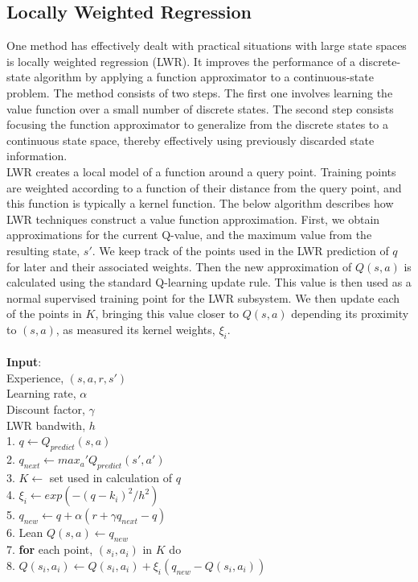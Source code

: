 \documentclass[11pt]{article}
\theoremstyle{definition}
\begin{document}
\subsection{Locally Weighted Regression}
One method has effectively dealt with practical situations with large state spaces is locally weighted regression (LWR). It improves the performance of a discrete-state algorithm by applying a function approximator to a continuous-state problem. The method consists of two steps. The first one involves learning the value function over a small number of discrete states. The second step consists focusing the function approximator to generalize from the discrete states to a continuous state space, thereby effectively using previously discarded state information.\\

LWR creates a local model of a function around a query point. Training points are weighted according to a function of their distance from the query point, and this function is typically a kernel function. The below algorithm describes how LWR techniques construct a value function approximation. First, we obtain approximations for the current Q-value, and the maximum value from the resulting state, $s'$. We keep track of the points used in the LWR prediction of $q$ for later and their associated weights. Then the new approximation of $Q(s,a)$ is calculated  using the standard Q-learning update rule. This value is then used as a normal supervised training point for the LWR subsystem. We then update each of the points in $K$, bringing this value closer to $Q(s,a)$ depending its proximity to $(s,a)$, as measured its kernel weights, $\xi_i$. \\
\\
\textbf{Input}:\\
Experience, $(s,a,r,s')$\\
Learning rate, $\alpha$\\
Discount factor, $\gamma$\\
LWR bandwith, $h$\\
1. $q \leftarrow Q_{predict}(s,a)$\\
2. $q_{next} \leftarrow max_a' Q_{predict}(s',a')$\\
3. $K \leftarrow$ set used in calculation of $q$\\
4. $\xi_i \leftarrow exp(-(q-k_i)^2/h^2)$\\
5. $q_{new} \leftarrow q+\alpha(r+\gamma q_{next} - q)$\\
6. Lean $Q(s,a)\leftarrow q_{new}$\\
7. \textbf{for} each point, $(s_i, a_i)$ in $K$ do\\
8. $Q(s_i, a_i) \leftarrow Q(s_i, a_i) + \xi_i(q_{new} - Q(s_i, a_i))$\\
\end{document}
